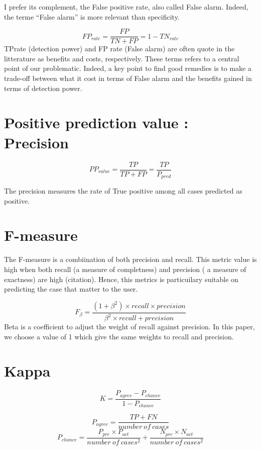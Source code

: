 \documentclass[
]{book}
\begin{document}
I prefer its complement, the False positive rate, also called False alarm. Indeed, the terme ``False alarm'' is more relevant than specificity.

\[FP_{rate} = \frac{FP}{TN+FP} = 1 - TN_{rate}\]
TPrate (detection power) and FP rate (False alarm) are often quote in the litterature as benefits and costs, respectively. These terms refers to a central point of our problematic. Indeed, a key point to find good remedies is to make a trade-off between what it cost in terms of False alarm and the benefits gained in terms of detection power.

\hypertarget{positive-prediction-value-precision}{%
\section{Positive prediction value : Precision}\label{positive-prediction-value-precision}}

\[PP_{value} = \frac{TP}{TP+FP} =  \frac{TP}{P_{pred}} \]

The precision measures the rate of True positive among all cases predicted as positive.

\hypertarget{f-measure}{%
\section{F-measure}\label{f-measure}}

The F-measure is a combiination of both precision and recall. This metric value is high when both recall (a measure of completness) and precision ( a measure of exactness) are high (citation). Hence, this metrics is particuilary suitable on predicting the case that matter to the user.

\[F_\beta = \frac{(1+\beta^2) \times recall \times precision}{\beta^2 \times recall + precision}\]
Beta is a coefficient to adjust the weight of recall against precision. In this paper, we choose a value of 1 which give the same weights to recall and precision.

\hypertarget{kappa}{%
\section{Kappa}\label{kappa}}

\[K = \frac{P_{agree}-P_{chance}}{1-P_{chance}}\]

\[P_{agree} = \frac{TP + FN} {number \ of \ cases} \]
\[P_{chance} = \frac{P_{pre} \times P_{act}}{number \ of \ cases^2}+\frac{N_{pre} \times N_{act}}{number \ of \ cases^2}\]
\end{document}
